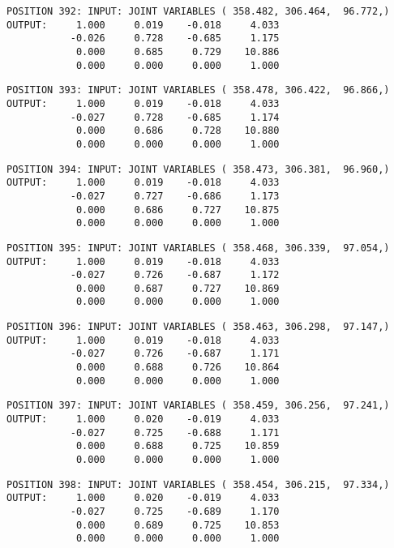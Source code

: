 \begin{verbatim}
POSITION 392: INPUT: JOINT VARIABLES ( 358.482, 306.464,  96.772,)
OUTPUT:     1.000     0.019    -0.018     4.033
           -0.026     0.728    -0.685     1.175
            0.000     0.685     0.729    10.886
            0.000     0.000     0.000     1.000
\end{verbatim} \pagebreak[1]\begin{verbatim}
POSITION 393: INPUT: JOINT VARIABLES ( 358.478, 306.422,  96.866,)
OUTPUT:     1.000     0.019    -0.018     4.033
           -0.027     0.728    -0.685     1.174
            0.000     0.686     0.728    10.880
            0.000     0.000     0.000     1.000
\end{verbatim} \pagebreak[1]\begin{verbatim}
POSITION 394: INPUT: JOINT VARIABLES ( 358.473, 306.381,  96.960,)
OUTPUT:     1.000     0.019    -0.018     4.033
           -0.027     0.727    -0.686     1.173
            0.000     0.686     0.727    10.875
            0.000     0.000     0.000     1.000
\end{verbatim} \pagebreak[1]\begin{verbatim}
POSITION 395: INPUT: JOINT VARIABLES ( 358.468, 306.339,  97.054,)
OUTPUT:     1.000     0.019    -0.018     4.033
           -0.027     0.726    -0.687     1.172
            0.000     0.687     0.727    10.869
            0.000     0.000     0.000     1.000
\end{verbatim} \pagebreak[1]\begin{verbatim}
POSITION 396: INPUT: JOINT VARIABLES ( 358.463, 306.298,  97.147,)
OUTPUT:     1.000     0.019    -0.018     4.033
           -0.027     0.726    -0.687     1.171
            0.000     0.688     0.726    10.864
            0.000     0.000     0.000     1.000
\end{verbatim} \pagebreak[1]\begin{verbatim}
POSITION 397: INPUT: JOINT VARIABLES ( 358.459, 306.256,  97.241,)
OUTPUT:     1.000     0.020    -0.019     4.033
           -0.027     0.725    -0.688     1.171
            0.000     0.688     0.725    10.859
            0.000     0.000     0.000     1.000
\end{verbatim} \pagebreak[1]\begin{verbatim}
POSITION 398: INPUT: JOINT VARIABLES ( 358.454, 306.215,  97.334,)
OUTPUT:     1.000     0.020    -0.019     4.033
           -0.027     0.725    -0.689     1.170
            0.000     0.689     0.725    10.853
            0.000     0.000     0.000     1.000
\end{verbatim} \pagebreak[1]\begin{verbatim}

\end{verbatim}
